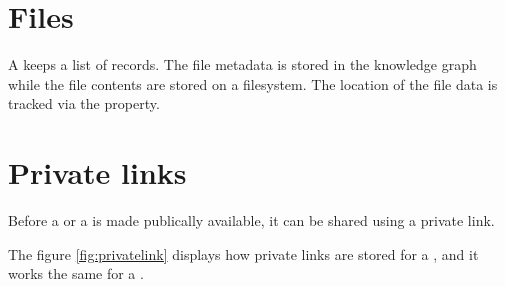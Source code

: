 
\section{Files}

  A  keeps a list of  records.  The file
  metadata is stored in the knowledge graph while the file contents are
  stored on a filesystem.  The location of the file data is tracked via the
   property.


\section{Private links}

  Before a  or a  is made publically
  available, it can be shared using a private link.


  The figure \ref{fig:privatelink} displays how private links are stored for
  a , and it works the same for a .

